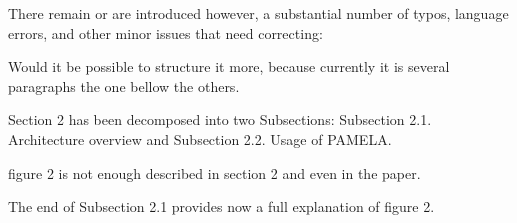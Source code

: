 \documentclass[10pt]{article}
\begin{document}
\begin{response}{There remain or are introduced however, a substantial number of typos, language errors, and other minor issues that need correcting:}

\end{response}


\begin{response}{Would it be possible to structure it more, because currently it is several paragraphs the one bellow the others.}

Section 2 has been decomposed into two Subsections: Subsection 2.1.  Architecture overview
and Subsection 2.2.  Usage of PAMELA.

\end{response}


\begin{response}{figure 2 is not enough described in section 2 and even in the paper.}

The end of Subsection 2.1 provides now a full explanation of figure 2.

\end{response}
\end{document}
